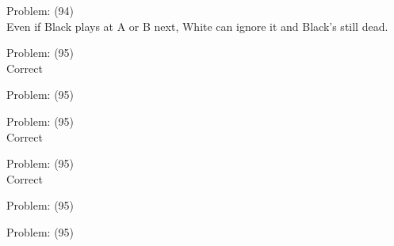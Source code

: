 \documentclass[11pt]{article}
\begin{document}
\begin{minipage}[t]{0.5\textwidth}
  {\centering
  
  Problem: (94)\\
  Even if Black plays at A or B next, White can ignore it and Black's still dead.\\
  }
\end{minipage}
\begin{minipage}[t]{0.5\textwidth}
  {\centering
  
  Problem: (95)\\
  Correct\\
  }
\end{minipage}
\begin{minipage}[t]{0.5\textwidth}
  {\centering
  
  Problem: (95)\\
  
  }
\end{minipage}
\begin{minipage}[t]{0.5\textwidth}
  {\centering
  
  Problem: (95)\\
  Correct\\
  }
\end{minipage}
\begin{minipage}[t]{0.5\textwidth}
  {\centering
  
  Problem: (95)\\
  Correct\\
  }
\end{minipage}
\begin{minipage}[t]{0.5\textwidth}
  {\centering
  
  Problem: (95)\\
  
  }
\end{minipage}
\begin{minipage}[t]{0.5\textwidth}
  {\centering
  
  Problem: (95)\\
  
  }
\end{minipage}
\end{document}
